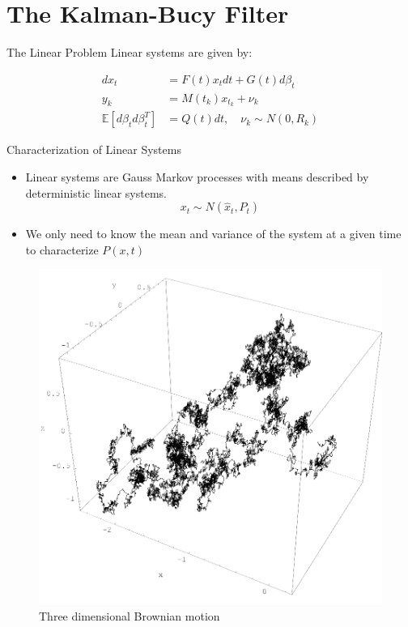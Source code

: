 \documentclass{beamer}
\begin{document}
\section{The Kalman-Bucy Filter}

\begin{frame}{The Linear Problem}
  Linear systems are given by:

  \pause
    \begin{align}
      dx_t &= F(t) x_t dt + G(t) d\beta_t \\
      y_k &= M(t_k) x_{t_k} + \nu_k \\
      \mathbb{E}[d\beta_td\beta_t^T] &= Q(t) dt, \quad \nu_k \sim N(0,R_k)
    \end{align}
   \pause
 
\end{frame}

\begin{frame}{Characterization of Linear Systems}
  \begin{itemize}
   
  \item Linear systems are Gauss Markov processes with means described by
    deterministic linear systems.
    \begin{equation}
      x_t \sim N(\hat{x}_t,P_t)
    \end{equation}
   
  \item We only need to know the mean and variance of the system at a given time
    to characterize $P(x,t)$
  \end{itemize}
  \begin{figure}
    \includegraphics[scale=0.14]{Wiener_process_3d.png}
    \caption{Three dimensional Brownian motion}
  \end{figure}
\end{frame}
\end{document}
